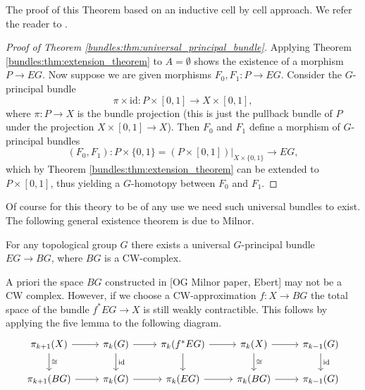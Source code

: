 The proof of this Theorem based on an inductive cell by cell approach. We refer the reader to \cite[Theorem 2.7.1]{ebert_bordism_script}. 

\begin{proof}[Proof of Theorem \ref{bundles:thm:universal_principal_bundle}]
    Applying Theorem \ref{bundles:thm:extension_theorem} to $A = \emptyset$ shows the existence of a morphism $P \to EG$. Now suppose we are given morphisms $F_0,F_1 \colon P \to EG$. Consider the $G$-principal bundle 
    \[
    \pi \times \mathrm{id} \colon P \times [0,1] \to X \times [0,1],
    \]
    where $\pi \colon P \to X$ is the bundle projection (this is just the pullback bundle of $P$ under the projection $X \times [0,1] \to X$). Then $F_0$ and $F_1$ define a morphism of $G$-principal bundles 
    \[
    (F_0,F_1) \colon P \times \{0,1\} = (P \times [0,1])|_{X \times \{0,1\}}\to EG,
    \]
    which by Theorem \ref{bundles:thm:extension_theorem} can be extended to $P \times [0,1]$, thus yielding a $G$-homotopy between $F_0$ and $F_1$.
\end{proof}

Of course for this theory to be of any use we need such universal bundles to exist. The following general existence theorem is due to Milnor.

\begin{theorem}
    For any topological group $G$ there exists a universal $G$-principal bundle $EG \to BG$, where $BG$ is a CW-complex.
\end{theorem}

A priori the space $BG$ constructed in [OG Milnor paper, Ebert] may not be a CW complex. However, if we choose a CW-approximation $f \colon X \to BG$ the total space of the bundle $f^\ast EG \to X$ is still weakly contractible. This follows by applying the five lemma to the following diagram.
\[\begin{tikzcd}
	{\pi_{k+1}(X)} & {\pi_k(G)} & {\pi_k(f^\ast EG)} & {\pi_k(X)} & {\pi_{k-1}(G)} \\
	{\pi_{k+1}(BG)} & {\pi_k(G)} & {\pi_k(EG)} & {\pi_k(BG)} & {\pi_{k-1}(G)}
	\arrow[from=1-1, to=1-2]
	\arrow["\cong", from=1-1, to=2-1]
	\arrow[from=1-2, to=1-3]
	\arrow["{\mathrm{id}}", from=1-2, to=2-2]
	\arrow[from=1-3, to=1-4]
	\arrow[from=1-3, to=2-3]
	\arrow[from=1-4, to=1-5]
	\arrow["\cong", from=1-4, to=2-4]
	\arrow["{\mathrm{id}}", from=1-5, to=2-5]
	\arrow[from=2-1, to=2-2]
	\arrow[from=2-2, to=2-3]
	\arrow[from=2-3, to=2-4]
	\arrow[from=2-4, to=2-5]
\end{tikzcd}\]

